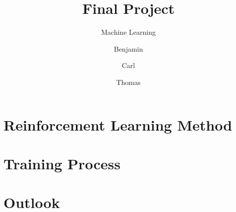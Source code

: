 \documentclass[12pt, a4paper, bibliography=totoc]{scrreprt}
\title{Final Project}
\subtitle{Machine Learning}
\author{Benjamin \and Carl \and Thomas}
\begin{document}
\maketitle
\tableofcontents

\chapter{Reinforcement Learning Method}

\chapter{Training Process}

\chapter{Outlook}



\appendix
\printbibliography
\end{document}
